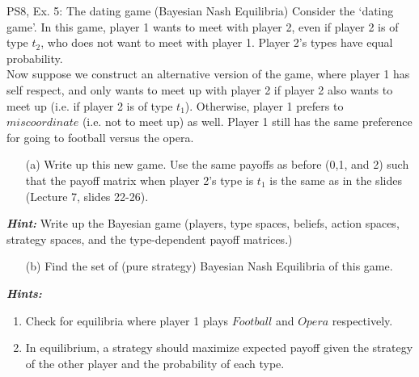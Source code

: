 \begin{frame}{PS8, Ex. 5: The dating game (Bayesian Nash Equilibria)}
    Consider the ‘dating game’. In this game, player 1 wants to meet with player 2, even if player 2 is of type $t_2$, who does not want to meet with player 1. Player 2’s types have equal probability.\\\medskip
    Now suppose we construct an alternative version of the game, where player 1 has self respect, and only wants to meet up with player 2 if player 2 also wants to meet up (i.e. if player 2 is of type $t_1$). Otherwise, player 1 prefers to $miscoordinate$ (i.e. not to meet up) as well. Player 1 still has the same preference for going to football versus the opera.
    \begin{itemize}
      \item[(a)] Write up this new game. Use the same payoffs as before (0,1, and 2) such that the payoff matrix when player 2’s type is $t_1$ is the same as in the slides (Lecture 7, slides 22-26).
    \end{itemize}
    \textbf{\textit{Hint:}} Write up the Bayesian game (players, type spaces, beliefs, action spaces, strategy spaces, and the type-dependent payoff matrices.)
    \begin{itemize}
      \item[(b)] Find the set of (pure strategy) Bayesian Nash Equilibria of this game.
    \end{itemize}
    \textbf{\textit{Hints:}}
    \begin{enumerate}
      \item Check for equilibria where player 1 plays $Football$ and $Opera$ respectively.
      \item In equilibrium, a strategy should maximize expected payoff given the strategy of the other player and the probability of each type.
    \end{enumerate}
    \vfill\null
\end{frame}

